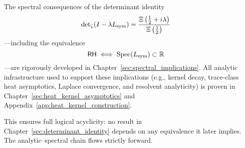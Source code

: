 \begin{remark}
\label{rem:forward_spectral_closure}

The spectral consequences of the determinant identity
\[
\det\nolimits_\zeta(I - \lambda L_{\mathrm{sym}}) = \frac{\Xi\left( \tfrac{1}{2} + i\lambda \right)}{\Xi\left( \tfrac{1}{2} \right)}
\]
—including the equivalence
\[
\mathsf{RH} \iff \operatorname{Spec}(L_{\mathrm{sym}}) \subset \mathbb{R}
\]
—are rigorously developed in Chapter~\ref{sec:spectral_implications}. All analytic infrastructure used to support these implications (e.g., kernel decay, trace-class heat asymptotics, Laplace convergence, and resolvent analyticity) is proven in Chapter~\ref{sec:heat_kernel_asymptotics} and Appendix~\ref{app:heat_kernel_construction}.

\medskip

\noindent
This ensures full logical acyclicity: no result in Chapter~\ref{sec:determinant_identity} depends on any equivalence it later implies. The analytic–spectral chain flows strictly forward.
\end{remark}
